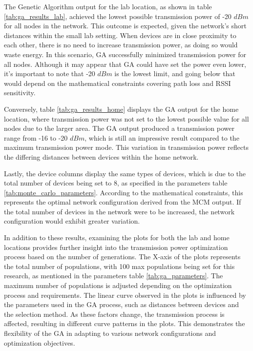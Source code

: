 The Genetic Algorithm output for the lab location, as shown in table \ref{tab:ga_results_lab}, achieved the lowest possible transmission power of -20 $dBm$ for all nodes in the network. This outcome is expected, given the network's short distances within the small lab setting. When devices are in close proximity to each other, there is no need to increase transmission power, as doing so would waste energy. In this scenario, GA successfully minimized transmission power for all nodes. Although it may appear that GA could have set the power even lower, it's important to note that -20 $dBm$ is the lowest limit, and going below that would depend on the mathematical constraints covering path loss and RSSI sensitivity.

Conversely, table \ref{tab:ga_results_home} displays the GA output for the home location, where transmission power was not set to the lowest possible value for all nodes due to the larger area. The GA output produced a transmission power range from -16 to -20 $dBm$, which is still an impressive result compared to the maximum transmission power mode. This variation in transmission power reflects the differing distances between devices within the home network.

Lastly, the device columns display the same types of devices, which is due to the total number of devices being set to 8, as specified in the parameters table \ref{tab:monte_carlo_parameters}. According to the mathematical constraints, this represents the optimal network configuration derived from the MCM output. If the total number of devices in the network were to be increased, the network configuration would exhibit greater variation.

In addition to these results, examining the plots for both the lab and home locations provides further insight into the transmission power optimization process based on the number of generations. The X-axis of the plots represents the total number of populations, with 100 max populations being set for this research, as mentioned in the parameters table \ref{tab:ga_parameters}. The maximum number of populations is adjusted depending on the optimization process and requirements. The linear curve observed in the plots is influenced by the parameters used in the GA process, such as distances between devices and the selection method. As these factors change, the transmission process is affected, resulting in different curve patterns in the plots. This demonstrates the flexibility of the GA in adapting to various network configurations and optimization objectives.

